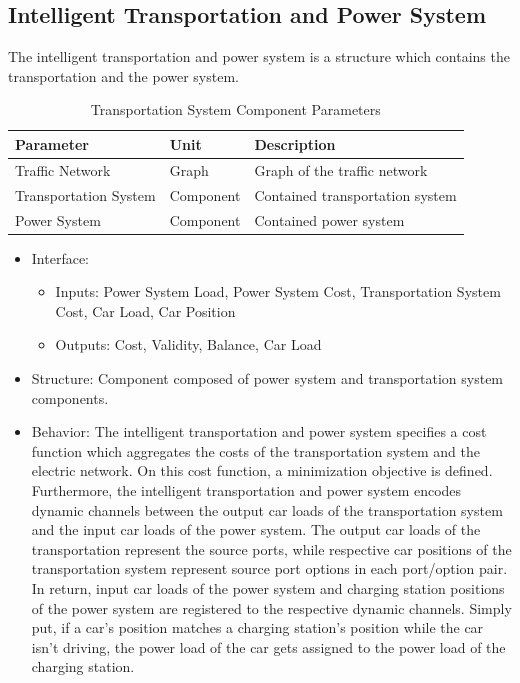 \subsection{Intelligent Transportation and Power System}

The intelligent transportation and power system is a structure which contains the transportation and the power system.

\begin{table}[h]
	\renewcommand{\arraystretch}{1.3}
	\caption{Transportation System Component Parameters}
	\centering
	\begin{tabular}{lll}
		\hline
		\textbf{Parameter}                    & \textbf{Unit} & \textbf{Description} \\ \hline
		Traffic Network                  	  & Graph          & Graph of the traffic network      \\
		Transportation System                 & Component    & Contained transportation system    \\ 
		Power System                 		  & Component   & Contained power system    \\ \hline
	\end{tabular}
\end{table}
\begin{itemize}
	\item Interface: 
	\begin{itemize}
		\item Inputs: Power System Load, Power System Cost, Transportation System Cost, Car Load, Car Position
		\item Outputs: Cost, Validity, Balance, Car Load
	\end{itemize}	
	\item Structure: Component composed of power system and transportation system components.
	\item Behavior: The intelligent transportation and power system specifies a cost function which aggregates the costs of the transportation system and the electric network. On this cost function, a minimization objective is defined. Furthermore, the intelligent transportation and power system encodes dynamic channels between the output car loads of the transportation system and the input car loads of the power system. The output car loads of the transportation represent the source ports, while respective car positions of the transportation system represent source port options in each port/option pair. In return, input car loads of the power system and charging station positions of the power system are registered to the respective dynamic channels. Simply put, if a car's position matches a charging station's position while the car isn't driving, the power load of the car gets assigned to the power load of the charging station. 
\end{itemize}



